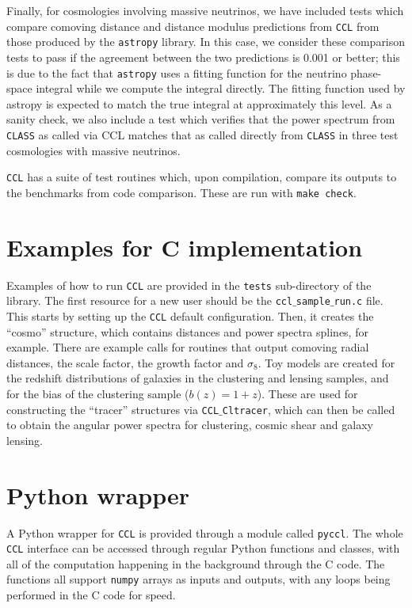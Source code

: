 \documentclass[\docopts]{\docclass}
\newcommand{\ccl}{{\tt CCL}\xspace}
\begin{document}
Finally, for cosmologies involving massive neutrinos, we have included tests which compare comoving distance and distance modulus predictions from {\tt CCL} from those produced by the {\tt astropy} \citep{astropy} library. In this case, we consider these comparison tests to pass if the agreement between the two predictions is 0.001 or better; this is due to the fact that {\tt astropy} uses a fitting function for the neutrino phase-space integral while we compute the integral directly. The fitting function used by astropy is expected to match the true integral at approximately this level. As a sanity check, we also include a test which verifies that the power spectrum from {\tt CLASS} as called via CCL matches that as called directly from {\tt CLASS} in three test cosmologies with massive neutrinos. 

\ccl has a suite of test routines which, upon compilation, compare its outputs to the benchmarks from code comparison. These are run with {\tt make check}.

\section{Examples for C implementation}
\label{sec:example}

Examples of how to run \ccl are provided in the {\tt tests} sub-directory of the library. The first resource for a new user should be the {\tt ccl$\_$sample$\_$run.c} file. This starts by setting up the \ccl default configuration. Then, it creates the ``cosmo'' structure, which contains distances and power spectra splines, for example. There are example calls for routines that output comoving radial distances, the scale factor, the growth factor and $\sigma_8$. Toy models are created for the redshift distributions of galaxies in the clustering and lensing samples, and for the bias of the clustering sample ($b(z)=1+z$). These are used for constructing the ``tracer'' structures via {\tt CCL$\_$Cltracer}, which can then be called to obtain the angular power spectra for clustering, cosmic shear and galaxy lensing.


\section{Python wrapper}
\label{sec:python}

A Python wrapper for \ccl is provided through a module called {\tt pyccl}. The whole \ccl interface can be accessed through regular Python functions and classes, with all of the computation happening in the background through the C code. The functions all support {\tt numpy} arrays as inputs and outputs, with any loops being performed in the C code for speed.
\end{document}
